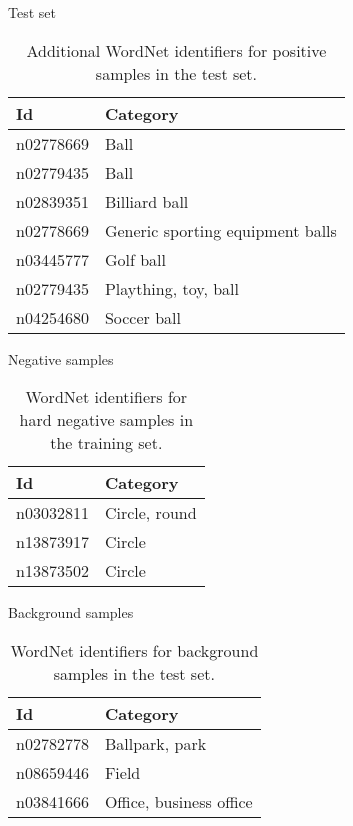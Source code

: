 \documentclass{beamer}
\begin{document}
\begin{frame}{Test set}
	\begin{table}[H]
		\centering
		\caption{Additional WordNet identifiers for positive samples in the test set.}
		\label{tab:postest}
		\begin{tabularx}{\textwidth}{lX}
			\toprule
			\textbf{Id} & \textbf{Category} \\
			\midrule
				n02778669 & Ball \\
				n02779435 & Ball \\
				n02839351 & Billiard ball \\
				n02778669 & Generic sporting equipment balls \\
				n03445777 & Golf ball \\
				n02779435 & Plaything, toy, ball \\
				n04254680 & Soccer ball \\
			\bottomrule
		\end{tabularx}
	\end{table}
\end{frame}

\begin{frame}{Negative samples}
	\begin{table}[H]
		\centering
		\caption{WordNet identifiers for hard negative samples in the training set.}
		\label{tab:negtraining}
		\begin{tabularx}{\textwidth}{lX}
			\toprule
			\textbf{Id} & \textbf{Category} \\
			\midrule
				n03032811 & Circle, round \\
				n13873917 & Circle \\
				n13873502 & Circle \\
			\bottomrule
		\end{tabularx}
	\end{table}
\end{frame}

\begin{frame}{Background samples}
	\begin{table}[H]
		\centering
		\caption{WordNet identifiers for background samples in the test set.}
		\label{tab:baktraining}
		\begin{tabularx}{\textwidth}{lX}
			\toprule
			\textbf{Id} & \textbf{Category} \\
			\midrule
				n02782778 & Ballpark, park \\
				n08659446 & Field \\
				n03841666 & Office, business office \\
			\bottomrule
		\end{tabularx}
	\end{table}
\end{frame}
\end{document}
